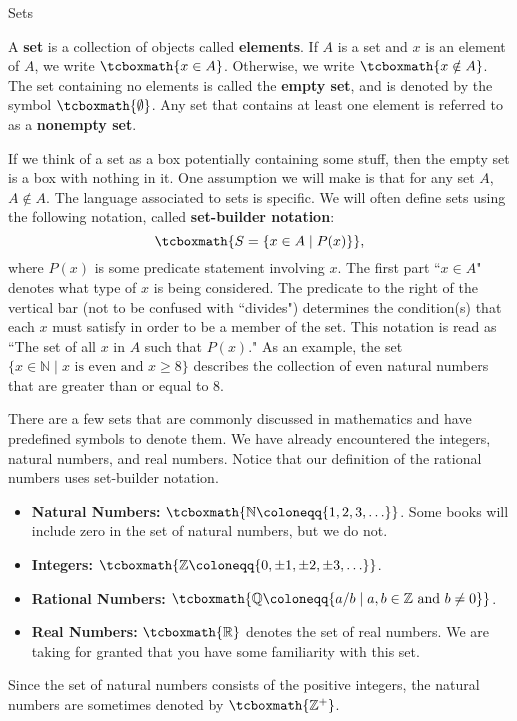 \begin{section}{Sets}

\begin{definition}
A \textbf{set} is a collection of objects called \textbf{elements}. If $A$ is a set and $x$ is an element of $A$, we write $\tcboxmath{x\in A}$. Otherwise, we write $\tcboxmath{x\notin A}$. The set containing no elements is called the \textbf{empty set}, and is denoted by the symbol $\tcboxmath{\emptyset}$. Any set that contains at least one element is referred to as a \textbf{nonempty set}.
\end{definition}

If we think of a set as a box potentially containing some stuff, then the empty set is a box with nothing in it. One assumption we will make is that for any set $A$, $A\notin A$. The language associated to sets is specific.  We will often define sets using the following notation, called \textbf{set-builder notation}:
\[
\tcboxmath{S=\{x \in A\mid P(x)\}},
\]
where $P(x)$ is some predicate statement involving $x$. The first part ``$x \in A$" denotes what type of $x$ is being considered.  The predicate to the right of the vertical bar (not to be confused with ``divides") determines the condition(s) that each $x$ must satisfy in order to be a member of the set.  This notation is read as ``The set of all $x$ in $A$ such that $P(x)$." As an example, the set $\{x\in \mathbb{N}\mid x \mbox{ is even and }x\geq 8\}$ describes the collection of even natural numbers that are greater than or equal to 8.

There are a few sets that are commonly discussed in mathematics and have predefined symbols to denote them. We have already encountered the integers, natural numbers, and real numbers. Notice that our definition of the rational numbers uses set-builder notation.
\begin{itemize}
\item \textbf{Natural Numbers:} $\tcboxmath{\mathbb{N}\coloneqq \{1,2,3,\ldots\}}$. Some books will include zero in the set of natural numbers, but we do not.
\item \textbf{Integers:} $\tcboxmath{\mathbb{Z}\coloneqq \{0, \pm 1, \pm2, \pm 3, \ldots\}}$.
\item \textbf{Rational Numbers:} $\tcboxmath{\mathbb{Q}\coloneqq \{a/b \mid a, b \in \mathbb{Z} \text{ and } b \neq 0\}}$.
\item \textbf{Real Numbers:} $\tcboxmath{\mathbb{R}}$ denotes the set of real numbers. We are taking for granted that you have some familiarity with this set. 
\end{itemize}
Since the set of natural numbers consists of the positive integers, the natural numbers are sometimes denoted by $\tcboxmath{\mathbb{Z}^+}$.


\end{section}
